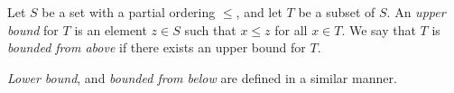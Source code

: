 \documentclass[12pt]{article}
\begin{document}
Let $S$ be a set with a partial ordering $\leq$, and let $T$ be a subset of $S$. 
An {\em upper bound} for $T$ is an element $z \in S$ such that $x \leq z$ for all $x \in T$. We say that $T$ is {\em bounded from above} if there exists an upper bound for $T$.

{\em Lower bound}, and \emph{bounded from below} are defined in a similar manner.
\end{document}
